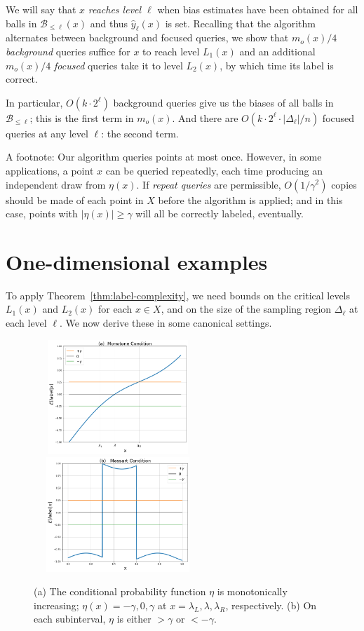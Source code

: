 \documentclass[twoside]{article}
\def\B{{\mathcal B}}
\def\yh{{\widehat{y}}}
\begin{document}
We will say that $x$ \emph{reaches level $\ell$} when bias estimates have been obtained for all balls in $\B_{\leq \ell}(x)$ and thus $\yh_\ell(x)$ is set. Recalling that the algorithm alternates between background and focused queries, we show that $m_o(x)/4$ \emph{background} queries suffice for $x$ to reach level $L_1(x)$ and an additional $m_o(x)/4$ \emph{focused} queries take it to level $L_2(x)$, by which time its label is correct.

In particular, $O(k \cdot 2^\ell)$ background queries give us the biases of all balls in $\B_{\leq \ell}$; this is the first term in $m_o(x)$. And there are $O(k \cdot 2^\ell \cdot |\Delta_\ell|/n)$ focused queries at any level $\ell$: the second term.

A footnote: Our algorithm queries points at most once. However, in some applications, a point $x$ can be queried repeatedly, each time producing an independent draw from $\eta(x)$. If \emph{repeat queries} are permissible, $O(1/\gamma^2)$ copies should be made of each point in $X$ before the algorithm is applied; and in this case, points with $|\eta(x)| \geq \gamma$ will all be correctly labeled, eventually.



\section{One-dimensional examples}

To apply Theorem~\ref{thm:label-complexity}, we need bounds on the critical levels $L_1(x)$ and $L_2(x)$ for each $x \in X$, and on the size of the sampling region $\Delta_\ell$ at each level $\ell$. We now derive these in some canonical settings.

\begin{figure}[t]
\begin{center}
  \includegraphics[width=2.5in,height=1.7in]{figures/Monotone.png}
\includegraphics[width=2.5in,height=1.7in]{figures/Massart.png}
\end{center}
\caption{(a) The conditional probability function $\eta$ is monotonically increasing; $\eta(x) = -\gamma, 0, \gamma$ at $x = \lambda_L, \lambda, \lambda_R$, respectively. (b) On each subinterval, $\eta$ is either $> \gamma$ or $<-\gamma$.}
\label{fig:oned}
\end{figure}
\end{document}

